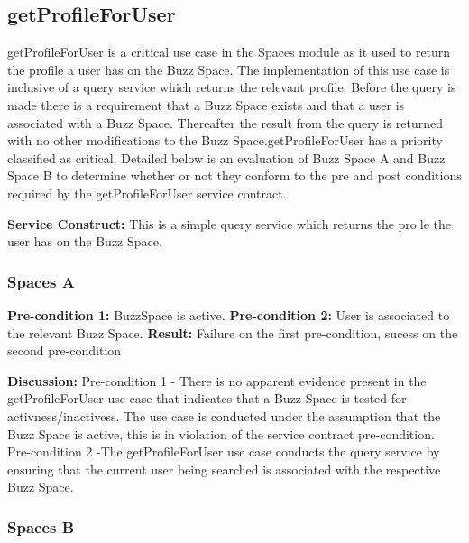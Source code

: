 
\newpage
\subsection{getProfileForUser}

getProfileForUser is a critical use case in the Spaces module as it used to return the profile a user has on the Buzz Space.
The implementation of this use case is inclusive of a query service which returns the relevant profile.
Before the query is made there is a requirement that a Buzz Space exists and that a user is associated with a Buzz Space.
Thereafter the result from the query is returned with no other modifications to the Buzz Space.getProfileForUser has a priority classified as critical. Detailed below is an evaluation of Buzz Space A and Buzz Space B to determine whether or not they conform to the pre and post conditions required by the getProfileForUser service contract.   

\textbf{Service Construct:}  This is a simple query service which returns the prole the user has on the Buzz Space.	 
  				   \newline

\subsubsection{Spaces A}
\textbf{Pre-condition 1:}  BuzzSpace is active. \newline
\textbf{Pre-condition 2:}  User is associated to the relevant Buzz Space.\newline
\textbf{Result:}  Failure on the first pre-condition, sucess on the second pre-condition\newline\newline


\textbf{Discussion:} Pre-condition 1 -  There is no apparent evidence present in the getProfileForUser use case that indicates that a Buzz Space is tested for activness/inactivess. 
The use case is conducted under the assumption that the Buzz Space is active, this is in violation of the service contract pre-condition.
Pre-condition 2 -The getProfileForUser use case conducts the query service by ensuring that the current user being searched is associated with the respective Buzz Space. \newline \newline


\subsubsection{Spaces B}


